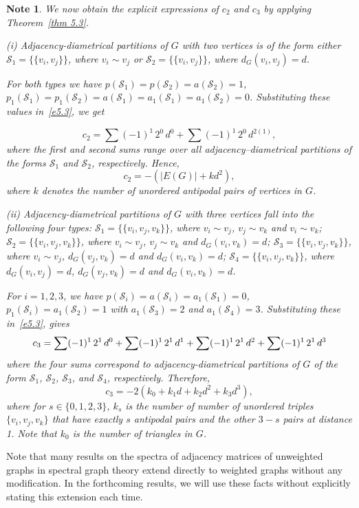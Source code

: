 \documentclass[12pt]{article}
\numberwithin{equation}{section}
\newtheorem{note}{Note}[section]
\begin{document}
	\begin{note}\normalfont
		We now obtain the explicit expressions of $c_2$ and $c_3$ by applying Theorem~\ref{thm 5.3}. 
		
		
		(i) Adjacency-diametrical partitions  of $G$ with two vertices is of the form either $\mathcal S_1=\{\{v_i,v_j\}\}$, where $v_i \sim v_j$ or $\mathcal S_2=\{\{v_i,v_j\}\}$, where $d_G(v_i,v_j)=d$.
		
		For both types we have $p(\mathcal S_1)=p(\mathcal S_2)=a(\mathcal S_2)=1$, $p_1(\mathcal S_1)=p_1(\mathcal S_2)=a(\mathcal S_1)=a_1(\mathcal S_1)=a_1(\mathcal S_2)=0$. Substituting these values in~\eqref{e5.3}, we get
		
		\[c_2={\sum} (-1)^{1}\,2^{0}\, d^{0}+{\sum} (-1)^{1} \,2^{0}\, d^{2(1)},\]
		where the first and second sums range over all adjacency–diametrical partitions of the forms $\mathcal S_1$ and $\mathcal S_2$, respectively. Hence,		
		$$c_2=-(|E(G)|+kd^2),$$
		where $k$ denotes the number of unordered antipodal pairs of vertices in $G$.
		
		(ii) Adjacency-diametrical partitions  of $G$ with three vertices fall into the following four types: $\mathcal S_1=\{\{v_i,v_j,v_k\}\}$, where $v_i \sim v_j$, $v_j \sim v_k$ and $v_i \sim v_k$; $\mathcal S_2=\{\{v_i,v_j,v_k\}\}$, where $v_i \sim v_j$, $v_j \sim v_k$ and $d_G(v_i,v_k)=d$; $\mathcal S_3=\{\{v_i,v_j,v_k\}\}$, where $v_i \sim v_j$, $d_G(v_j,v_k)=d$ and $d_G(v_i,v_k)=d$; $\mathcal S_4=\{\{v_i,v_j,v_k\}\}$, where $d_G(v_i,v_j)=d$, $d_G(v_j,v_k)=d$ and $d_G(v_i,v_k)=d$.
		
	For $i=1,2,3$, we have $p(\mathcal S_i)=a(\mathcal S_i)=a_1(\mathcal S_1)=0$, $p_1(\mathcal S_i)=a_1(\mathcal S_2)=1$ with $a_1(\mathcal S_3)=2$ and $a_1(\mathcal S_4)=3$. Substituting these in~\eqref{e5.3}, gives
		\[
		c_3=
			\sum (-1)^{1}\,2^{1}\,d^{0}
			+\sum (-1)^{1}\,2^{1}\,d^{1}
			+\sum (-1)^{1}\,2^{1}\,d^{2}
			+\sum (-1)^{1}\,2^{1}\,d^{3}\\
		\]
			where the four sums correspond to  adjacency-diametrical partitions  of $G$ of the form $\mathcal S_1$, $\mathcal S_2$, $\mathcal S_3$, and $\mathcal S_4$, respectively. Therefore,
		$$c_3=	 -2(k_0+k_1 d+k_2 d^{2}+k_3 d^{3}),$$			
		where for $s\in\{0,1,2,3\}$, $k_s$ is the number of number of unordered triples $\{v_i,v_j,v_k\}$ that have exactly $s$ antipodal pairs and the other 
		$3-s$ pairs at distance 1. Note that $k_0$ is the number of triangles in $G$.
	\end{note}

	
	Note that many results on the spectra of adjacency matrices of unweighted graphs in spectral graph theory extend directly to weighted graphs without any modification. In the forthcoming results, we will use these facts without explicitly stating this extension each time.
	
\end{document}
